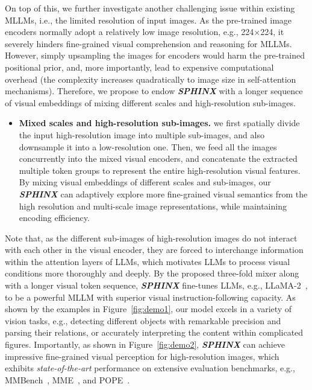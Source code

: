 \documentclass{article} \usepackage{iclr2024_conference,times}
\begin{document}
On top of this, we further investigate another challenging issue within existing MLLMs, i.e., the limited resolution of input images. As the pre-trained image encoders normally adopt a relatively low image resolution, e.g., 224$\times$224, it severely hinders fine-grained visual comprehension and reasoning for MLLMs. However, simply upsampling the images for encoders would harm the pre-trained positional prior, and, more importantly, lead to expensive computational overhead (the complexity increases quadratically to image size in self-attention mechanisms). 
Therefore, we propose to endow \textcolor{Goldenrod3}{\textbf{\textit{SPHINX}}} with a longer sequence of visual embeddings of mixing different scales and high-resolution sub-images. 
\begin{itemize} 
\item \textbf{Mixed scales and high-resolution sub-images.} we first spatially divide the input high-resolution image into multiple sub-images, and also downsample it into a low-resolution one. Then, we feed all the images concurrently into the mixed visual encoders, and concatenate the extracted multiple token groups to represent the entire high-resolution visual features. 
By mixing visual embeddings of different scales and sub-images, our \textcolor{Goldenrod3}{\textbf{\textit{SPHINX}}} can adaptively explore more fine-grained visual semantics from the high resolution and multi-scale image representations, while maintaining encoding efficiency.
\end{itemize} 


Note that, as the different sub-images of high-resolution images do not interact with each other in the visual encoder, they are forced to interchange information within the attention layers of LLMs, which motivates LLMs to process visual conditions more thoroughly and deeply. 
By the proposed three-fold mixer along with a longer visual token sequence, \textcolor{Goldenrod3}{\textbf{\textit{SPHINX}}} fine-tunes LLMs, e.g., LLaMA-2~\citep{Touvron2023Llama2O}, to be a powerful MLLM with superior visual instruction-following capacity. As shown by the examples in Figure~\ref{fig:demo1}, our model excels in a variety of vision tasks, e.g., detecting different objects with remarkable precision and parsing their relations, or accurately interpreting the content within complicated figures. Importantly, as shown in Figure~\ref{fig:demo2}, \textcolor{Goldenrod3}{\textbf{\textit{SPHINX}}} can achieve impressive fine-grained visual perception for high-resolution images, which exhibits \textit{state-of-the-art} performance on extensive evaluation benchmarks, e.g., MMBench~\citep{Liu2023MMBenchIY}, MME~\citep{Fu2023MMEAC}, and POPE~\citep{Li2023EvaluatingOH}.
\end{document}
